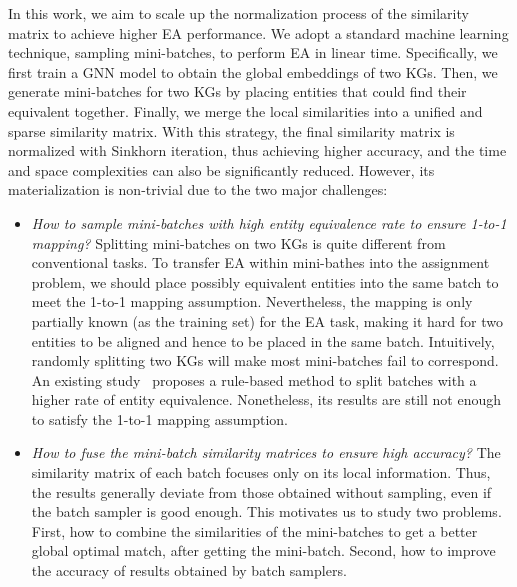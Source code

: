 In this work, we aim to scale up the normalization process of the similarity matrix to achieve higher EA performance.
We adopt a standard machine learning technique, sampling mini-batches, to perform EA in linear time.
Specifically, we first train a GNN model to obtain the global embeddings of two KGs.
Then, we generate mini-batches for two KGs by placing entities that could find their equivalent together.
Finally, we merge the local similarities into a unified and sparse similarity matrix.
With this strategy, the final similarity matrix is normalized with Sinkhorn iteration, thus achieving higher accuracy, and the time and space complexities can also be significantly reduced.
However, its materialization is non-trivial due to the two major challenges:
\begin{itemize}[topsep=0pt,itemsep=0pt,parsep=0pt,partopsep=0pt,leftmargin=*]
  \item \textit{How to sample mini-batches with high entity equivalence rate to ensure 1-to-1 mapping?} Splitting mini-batches on two KGs is quite different from conventional tasks. To transfer EA within mini-bathes into the assignment problem, we should place possibly equivalent entities into the same batch to meet the 1-to-1 mapping assumption. Nevertheless, the mapping is only partially known (as the training set) for the EA task, making it hard for two entities to be aligned and hence to be placed in the same batch. Intuitively, randomly splitting two KGs will make most mini-batches fail to correspond. An existing study~\cite{LargeEA22} proposes a rule-based method to split batches with a higher rate of entity equivalence. Nonetheless, its results are still not enough to satisfy the 1-to-1 mapping assumption.
  \item \textit{How to fuse the mini-batch similarity matrices to ensure high accuracy?} The similarity matrix of each batch focuses only on its local information. Thus, the results generally deviate from those obtained without sampling, even if the batch sampler is good enough. This motivates us to study two problems. First, how to combine the similarities of the mini-batches to get a better global optimal match, after getting the mini-batch. Second, how to improve the accuracy of results obtained by batch samplers.
\end{itemize}


